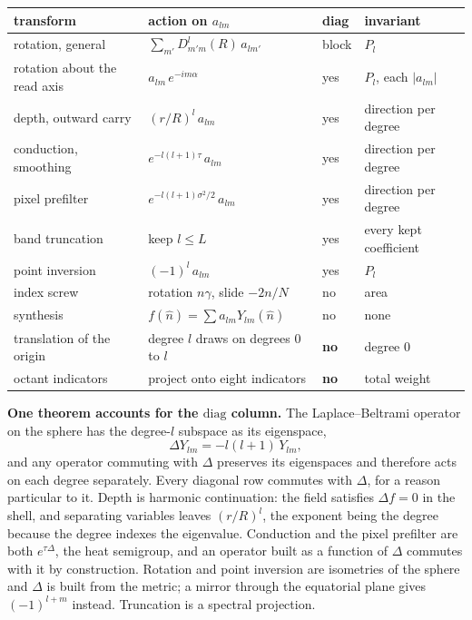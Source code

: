 \begin{center}
\begin{tabular}{llll}
\toprule
transform & action on \(a_{lm}\) & diag & invariant \\
\midrule
rotation, general & \(\sum_{m'} D^{l}_{m'm}(R)\, a_{lm'}\) & block & \(P_l\) \\
rotation about the read axis & \(a_{lm}\, e^{-im\alpha}\) & yes & \(P_l\), each \(|a_{lm}|\) \\
depth, outward carry & \((r/R)^{l}\, a_{lm}\) & yes & direction per degree \\
conduction, smoothing & \(e^{-l(l+1)\tau}\, a_{lm}\) & yes & direction per degree \\
pixel prefilter & \(e^{-l(l+1)\sigma^2/2}\, a_{lm}\) & yes & direction per degree \\
band truncation & keep \(l \le L\) & yes & every kept coefficient \\
point inversion & \((-1)^{l}\, a_{lm}\) & yes & \(P_l\) \\
index screw & rotation \(n\gamma\), slide \(-2n/N\) & no & area \\
synthesis & \(f(\hat n) = \sum a_{lm} Y_{lm}(\hat n)\) & no & none \\
translation of the origin & degree \(l\) draws on degrees \(0\) to \(l\) & \textbf{no} & degree \(0\) \\
octant indicators & project onto eight indicators & \textbf{no} & total weight \\
\bottomrule
\end{tabular}
\end{center}

\textbf{One theorem accounts for the \(\mathrm{diag}\) column.} The Laplace--Beltrami operator on the sphere has the degree-\(l\) subspace as its eigenspace,
\[
  \Delta Y_{lm} = -l(l+1)\, Y_{lm},
\]
and any operator commuting with \(\Delta\) preserves its eigenspaces and therefore acts on each degree separately. Every diagonal row commutes with \(\Delta\), for a reason particular to it. Depth is harmonic continuation: the field satisfies \(\Delta f = 0\) in the shell, and separating variables leaves \((r/R)^l\), the exponent being the degree because the degree indexes the eigenvalue. Conduction and the pixel prefilter are both \(e^{\tau\Delta}\), the heat semigroup, and an operator built as a function of \(\Delta\) commutes with it by construction. Rotation and point inversion are isometries of the sphere and \(\Delta\) is built from the metric; a mirror through the equatorial plane gives \((-1)^{l+m}\) instead. Truncation is a spectral projection.

